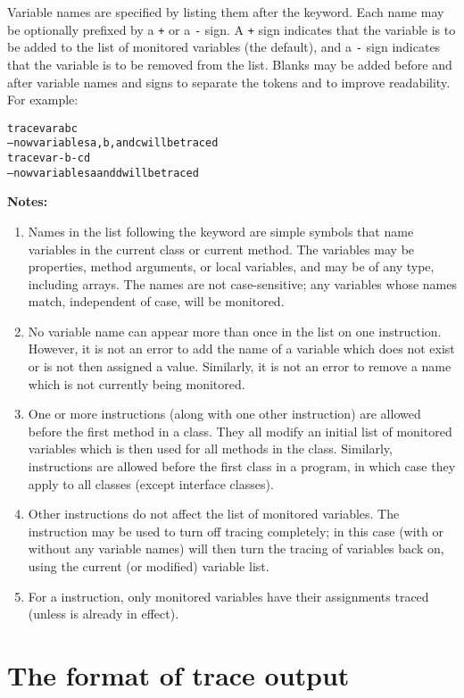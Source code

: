 Variable names are specified by listing them after the 
keyword.
Each name may be optionally prefixed by a \texttt{+} or a \texttt{-} sign.
A \texttt{+} sign indicates that the variable is to be added to the list
of monitored variables (the default), and a \texttt{-} sign indicates that
the variable is to be removed from the list.  Blanks may be added before
and after variable names and signs to separate the tokens and to improve
readability.
 For example:
\begin{alltt}
trace var a b c
-- now variables a, b, and c will be traced
trace var -b -c d
-- now variables a and d will be traced
\end{alltt}
 \textbf{Notes:}
\begin{enumerate}
\item 
Names in the list following the  keyword are simple symbols
that name variables in the current class or current method.
The variables may be properties, method arguments, or local variables,
and may be of any type, including arrays.
The names are not case-sensitive; any variables whose names match,
independent of case, will be monitored.
\item 
No variable name can appear more than once in the list on one
 instruction.  However, it is not an error to add the
name of a variable which does not exist or is not then assigned a value.
Similarly, it is not an error to remove a name which is not currently
being monitored.
\item 
One or more  instructions (along with one other
 instruction) are allowed before the first method in a
class.  They all modify an initial list of monitored variables which
is then used for all methods in the class.  Similarly,  instructions are allowed before the first class in a program,
in which case they apply to all classes (except interface classes).
\item 
Other  instructions do not affect the list of monitored
variables.
The  instruction may be used to turn off tracing
completely; in this case  (with or without any
variable names) will then turn the tracing of variables back on, using
the current (or modified) variable list.
\item 
For a  instruction, only monitored variables have their
assignments traced (unless  is already in effect).
\end{enumerate}
\section{The format of trace output}
 
